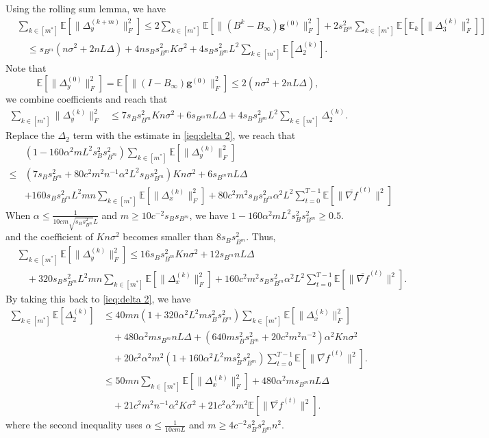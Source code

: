 \documentclass[10pt]{article}
\newcommand{\vg}{{\mathbf{g}}}
\newcommand{\EE}{\mathbb{E}}
\newcommand{\norm}[1]{\| #1 \|}
\begin{document}
Using the rolling sum lemma, we have
\begin{align*}
    &\sum_{k\in[m^*]}\EE[\norm{\Delta_y^{(k+m)}}_F^2] \le 2\sum_{k\in [m^*]} \EE[\norm{(B^k-B_\infty)\vg^{(0)}}_F^2]+ 2s_{B^m}^2\sum_{k\in[m^*]}\EE[\EE_k[\norm{\Delta_3^{(k)}}_F^2]]\\
    &\quad\le s_{B^m}(n\sigma^2+2nL\Delta)+4ns_Bs_{B^m}^2K\sigma^2+4s_Bs_{B^m}^2L^2\sum_{k\in[m^*]}\EE[\Delta_2^{(k)}]. 
\end{align*}
Note that 
\[\EE[\norm{\Delta_y^{(0)}}_F^2] = \EE[\norm{(I-B_\infty)\vg^{(0)}}_F^2]\le 2(n\sigma^2+2nL\Delta),\]
we combine coefficients and reach that 
\begin{align*}
    \sum_{k\in[m^*]}\norm{\Delta_y^{(k)}}_F^2 &\le 7s_Bs_{B^m}^2Kn\sigma^2+6s_{B^m}nL\Delta +4s_Bs_{B^m}^2L^2\sum_{k\in[m^*]}\Delta_2^{(k)}.
\end{align*}
Replace the $\Delta_2$ term with the estimate in \eqref{ieq:delta 2}, we reach that
\begin{align*}
    &(1-160\alpha^2mL^2 s_B^2s_{B^m}^2)\sum_{k\in[m^*]}\EE[\norm{\Delta_y^{(k)}}_F^2] \\
    \le& (7s_Bs_{B^m}^2+80c^2m^2n^{-1}\alpha^2L^2s_Bs_{B^m}^2)Kn\sigma^2+6s_{B^m}nL\Delta \\&+160s_Bs_{B^m}^2L^2mn\sum_{k\in[m^*]}\EE[\norm{\Delta_x^{(k)}}_F^2]+80c^2m^2s_Bs_{B^m}^2\alpha^2L^2\sum_{t=0}^{T-1}\EE[\norm{\overline{\nabla f}^{(t)}}^2]
\end{align*}
When $\alpha \le \frac{1}{10cm\sqrt{s_Bs_{B^m}^2}L}$ and $m\ge 10c^{-2}s_Bs_{B^m}$, we have $1-160\alpha^2mL^2 s_B^2s_{B^m}^2\ge 0.5$. and the coefficient of $Kn\sigma^2$ becomes smaller than $8s_Bs_{B^m}^2$. Thus,
\begin{align}\label{ieq(app):delta y-1}
    &\sum_{k\in[m^*]}\EE[\norm{\Delta_y^{(k)}}_F^2]\le 16s_Bs_{B^m}^2Kn\sigma^2+12s_{B^m}nL\Delta \\
    &\quad+320s_Bs_{B^m}^2L^2mn\sum_{k\in[m^*]}\EE[\norm{\Delta_x^{(k)}}_F^2]+160c^2m^2s_Bs_{B^m}^2\alpha^2L^2\sum_{t=0}^{T-1}\EE[\norm{\overline{\nabla f}^{(t)}}^2].\nonumber
\end{align}
By taking this back to \eqref{ieq:delta 2}, we have
\begin{align}\label{ieq:delta 2-1}
    \sum_{k\in[m^*]}\EE[\Delta_2^{(k)}] &\le 40mn(1+320\alpha^2L^2 ms_B^2s_{B^m}^2)\sum_{k\in[m^*]}\EE[\norm{\Delta_x^{(k)}}_F^2] \\
    &\quad+ 480\alpha^2ms_{B^m}nL\Delta + (640 ms_B^2s_{B^m}^2 +20c^2m^2n^{-2})\alpha^2Kn\sigma^2\nonumber\\
    &\quad+20c^2\alpha^2m^2(1+160\alpha^2 L^2ms_B^2s_{B^m}^2)\sum_{t=0}^{T-1}\EE[\norm{\overline{\nabla f}^{(t)}}^2].\nonumber\\
    &\le 50mn\sum_{k\in[m^*]}\EE[\norm{\Delta_x^{(k)}}_F^2]+480\alpha^2ms_{B^m}nL\Delta\nonumber\\
    &\quad+ 21c^2m^2n^{-1}\alpha^2K\sigma^2+21c^2\alpha^2m^2\EE[\norm{\overline{\nabla f}^{(t)}}^2].\nonumber
\end{align}
where the second inequality uses $\alpha \le \frac{1}{10cmL}$ and $m\ge 4c^{-2}s_B^2s_{B^m}^2n^2$.
\end{document}
